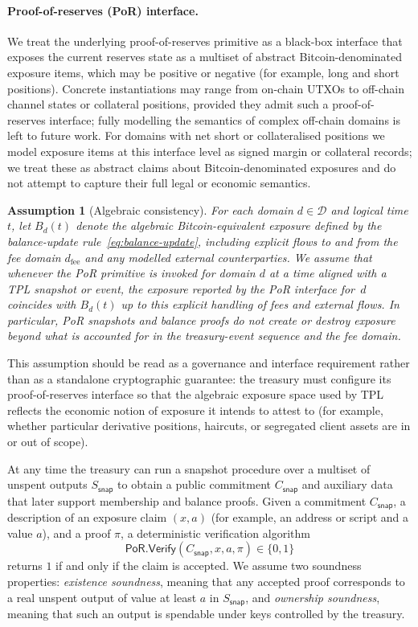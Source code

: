 \documentclass[11pt]{article}
\newtheorem{assumption}{Assumption}
\begin{document}
\paragraph{Proof-of-reserves (PoR) interface.}
We treat the underlying proof-of-reserves primitive as a black-box interface that exposes the current reserves state as a multiset of abstract Bitcoin-denominated exposure items, which may be positive or negative (for example, long and short positions).
Concrete instantiations may range from on-chain UTXOs to off-chain channel states or collateral positions, provided they admit
such a proof-of-reserves interface; fully modelling the semantics of complex off-chain domains is left to future work. For domains with net short or collateralised positions we model exposure items at this interface level as signed margin or collateral records; we treat these as abstract claims about Bitcoin-denominated exposures and do not attempt to capture their full legal or economic semantics.

\begin{assumption}[Algebraic consistency]\label{assump:algebraic-consistency}
For each domain $d \in \mathcal{D}$ and logical time $t$, let $B_d(t)$ denote the algebraic Bitcoin-equivalent exposure
defined by the balance-update rule~\eqref{eq:balance-update}, including explicit flows to and from the fee domain
$d_{\mathrm{fee}}$ and any modelled external counterparties.
We assume that whenever the PoR primitive is invoked for domain $d$ at a time aligned with a TPL snapshot or event,
the exposure reported by the PoR interface for~$d$ coincides with $B_d(t)$ up to this explicit handling of fees and
external flows.
In particular, PoR snapshots and balance proofs do not create or destroy exposure beyond what is accounted for in the
treasury-event sequence and the fee domain.
\end{assumption}

This assumption should be read as a governance and interface requirement rather than as a standalone cryptographic
guarantee: the treasury must configure its proof-of-reserves interface so that the algebraic exposure space used by TPL
reflects the economic notion of exposure it intends to attest to (for example, whether particular derivative positions,
haircuts, or segregated client assets are in or out of scope).

At any time the treasury can run a snapshot procedure over a multiset of unspent outputs $S_{\mathsf{snap}}$ to obtain a public commitment $C_{\mathsf{snap}}$ and auxiliary data that later support membership and balance proofs.
Given a commitment $C_{\mathsf{snap}}$, a description of an exposure claim $(x,a)$ (for example, an address or script and a value $a$), and a proof $\pi$, a deterministic verification algorithm
\[
  \mathsf{PoR.Verify}(C_{\mathsf{snap}}, x, a, \pi) \in \{0,1\}
\]
returns $1$ if and only if the claim is accepted.
We assume two soundness properties: \emph{existence soundness}, meaning that any accepted proof corresponds to a real unspent output of value at least $a$ in $S_{\mathsf{snap}}$, and \emph{ownership soundness}, meaning that such an output is spendable under keys controlled by the treasury.
\end{document}
